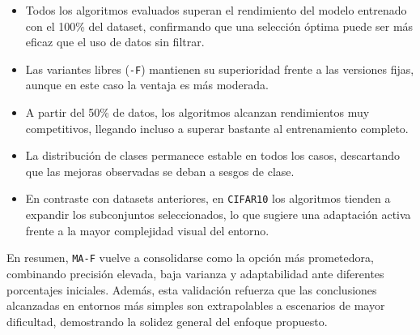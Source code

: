 \begin{itemize}
  \item Todos los algoritmos evaluados superan el rendimiento del modelo entrenado con el 100\% del dataset,
        confirmando que una selección óptima puede ser más eficaz que el uso de datos sin filtrar.
  \item Las variantes libres (\texttt{-F}) mantienen su superioridad frente a las versiones fijas, aunque en este caso la ventaja es más moderada.
  \item A partir del 50\% de datos, los algoritmos alcanzan rendimientos muy competitivos, llegando incluso a superar bastante al entrenamiento completo.
  \item La distribución de clases permanece estable en todos los casos, descartando que las mejoras observadas se deban a sesgos de clase.
  \item En contraste con datasets anteriores, en \texttt{CIFAR10} los algoritmos tienden a expandir los subconjuntos seleccionados,
        lo que sugiere una adaptación activa frente a la mayor complejidad visual del entorno.
\end{itemize}

En resumen, \texttt{MA-F} vuelve a consolidarse como la opción más prometedora, combinando precisión elevada,
baja varianza y adaptabilidad ante diferentes porcentajes iniciales.
Además, esta validación refuerza que las conclusiones alcanzadas en entornos más simples son extrapolables a escenarios de mayor dificultad,
demostrando la solidez general del enfoque propuesto.
